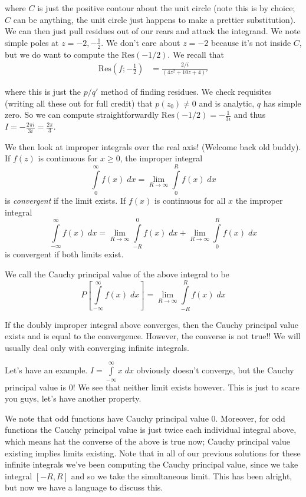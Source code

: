 \documentclass[10pt]{report}
\newcommand{\Res}[0]{\mathrm{Res} }
\begin{document}
where $C$ is just the positive contour about the unit circle (note this is by choice; $C$ can be anything, the unit circle just happens to make a prettier substitution). We can then just pull residues out of our rears and attack the integrand. We note simple poles at $z = -2, -\frac{1}{2}$. We don't care about $z=-2$ because it's not inside $C$, but we do want to compute the $\Res(-1/2)$. We recall that
\begin{align*}
    \Res\left( f; -\frac{1}{2} \right) &= \frac{2/i}{(4z^2 + 10z + 4)'}
\end{align*}

where this is just the $p/q'$ method of finding residues. We check requisites (writing all these out for full credit) that $p(z_0) \neq 0$ and is analytic, $q$ has simple zero. So we can compute straightforwardly $\Res(-1/2) = -\frac{1}{3i}$ and thus $I = -\frac{2\pi i}{3i} = \frac{2\pi}{3}$. 

We then look at improper integrals over the real axis! (Welcome back old buddy). If $f(z)$ is continuous for $x \geq 0$, the improper integral
$$\displaystyle\int\limits_{0}^{\infty}f(x)\;dx = \lim_{R \to \infty} \displaystyle\int\limits_{0}^{R}f(x)\;dx$$
is \emph{convergent} if the limit exists. If $f(x)$ is continuous for all $x$ the improper integral
$$\displaystyle\int\limits_{-\infty}^{\infty}f(x)\;dx = \lim_{R \to \infty} \displaystyle\int\limits_{-R}^{0}f(x)\;dx + \lim_{R \to \infty} \displaystyle\int\limits_{0}^{R}f(x)\;dx$$
is convergent if both limits exist. 

We call the Cauchy principal value of the above integral to be 
$$P\left[ \displaystyle\int\limits_{-\infty}^{\infty}f(x)\;dx \right] = \lim_{R \to \infty} \displaystyle\int\limits_{-R}^{R}f(x)\;dx$$

If the doubly improper integral above converges, then the Cauchy principal value exists and is equal to the convergence. However, the converse is not true!! We will usually deal only with converging infinite integrals. 

Let's have an example. $I = \displaystyle\int\limits_{-\infty}^{\infty}x\;dx$ obviously doesn't converge, but the Cauchy principal value is $0$! We see that neither limit exists however. This is just to scare you guys, let's have another property.

We note that odd functions have Cauchy principal value $0$. Moreover, for odd functions the Cauchy principal value is just twice each individual integral above, which means hat the converse of the above is true now; Cauchy principal value existing implies limits existing. Note that in all of our previous solutions for these infinite integrals we've been computing the Cauchy principal value, since we take integral $\left[ -R,R \right]$ and so we take the simultaneous limit. This has been alright, but now we have a language to discuss this.
\end{document}
